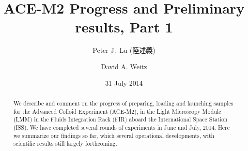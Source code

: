 \documentclass[
twocolumn,
rmp,aps]{revtex4-1}
\begin{document}
\begin{CJK*}{UTF8}{}

\title{ACE-M2 Progress and Preliminary results, Part 1}
\author{Peter J.~Lu (陸述義)}
\author{David A. Weitz}

\date{31 July 2014}
\begin{abstract}
We describe and comment on the progress of preparing, loading and launching
samples for the Advanced Colloid Experiment (ACE-M2), in the Light Microscopy
Module (LMM) in the Fluids Integration Rack (FIR) aboard the International Space
Station (ISS). We have completed several rounds of experiments in June and July,
2014. Here we summarize our findings so far, which several operational
developments, with scientific results still largely forthcoming.
\end{abstract}
\maketitle
\end{CJK*}

\setcounter{tocdepth}{1} 
\tableofcontents

\clearpage












\end{document}
